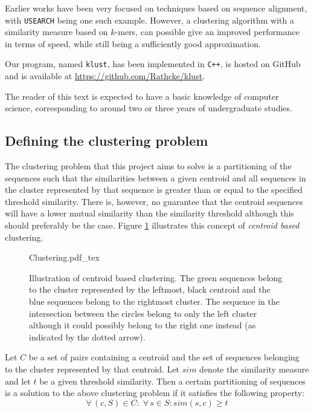 Earlier works have been very focused on techniques based on sequence alignment,
with \texttt{USEARCH} being one such example. However, a clustering algorithm
with a similarity measure based on $k$-mers, can possible give an improved
performance in terms of speed, while still being a sufficiently good
approximation.

Our program, named \texttt{klust}, has been implemented in \texttt{C++}, is
hosted on GitHub and is available at \url{https://github.com/Rathcke/klust}.

The reader of this text is expected to have a basic knowledge of computer
science, corresponding to around two or three years of undergraduate studies.


\subsection{Defining the clustering problem}

The clustering problem that this project aims to solve is a partitioning of
the sequences such that the similarities between a given centroid and all
sequences in the cluster represented by that sequence is greater than or equal
to the specified threshold similarity. There is, however, no guarantee that
the centroid sequences will have a lower mutual similarity than the similarity
threshold although this should preferably be the case. Figure
\ref{fig:clustering_concept} illustrates this concept of \emph{centroid based}
clustering.

\begin{figure}[h!]
  \centering
  \def\svgwidth{0.9\columnwidth}
  {Clustering.pdf_tex}
  \caption{Illustration of centroid based clustering. The green sequences
    belong to the cluster represented by the leftmost, black centroid and the
    blue sequences belong to the rightmost cluster. The sequence in the
    intersection between the circles belong to only the left cluster although
    it could possibly belong to the right one instead (as indicated by
    the dotted arrow).}
  \label{fig:clustering_concept}
\end{figure}

Let $C$ be a set of pairs containing a centroid and the set of sequences
belonging to the cluster represented by that centroid. Let $sim$ denote the
similarity measure and let $t$ be a given threshold similarity. Then a certain
partitioning of sequences is a solution to the above clustering problem if it
satisfies the following property: \[   \forall\, (c,S) \in C:\; \forall\, s
\in S: sim(s,c) \geq t \]
